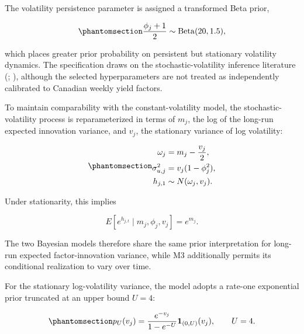 \documentclass[
  12pt,
  letterpaper,
  DIV=11,
  numbers=noendperiod]{scrreprt}
\begin{document}
The volatility persistence parameter is assigned a transformed Beta
prior,

\begin{equation}\protect\phantomsection\label{eq-volatility-persistence-prior}{
\frac{\phi_j+1}{2}
\sim\operatorname{Beta}(20,1.5),
}\end{equation}

which places greater prior probability on persistent but stationary
volatility dynamics. The specification draws on the
stochastic-volatility inference literature
(;
), although the
selected hyperparameters are not treated as independently calibrated to
Canadian weekly yield factors.

To maintain comparability with the constant-volatility model, the
stochastic-volatility process is reparameterized in terms of \(m_j\),
the log of the long-run expected innovation variance, and \(v_j\), the
stationary variance of log volatility:

\begin{equation}\protect\phantomsection\label{eq-finite-reparam}{
\begin{aligned}
\omega_j&=m_j-\frac{v_j}{2},\\
\sigma_{u,j}^2&=v_j(1-\phi_j^2),\\
h_{j,1}&\sim N(\omega_j,v_j).
\end{aligned}
}\end{equation}

Under stationarity, this implies

\[
E[e^{h_{j,t}}\mid m_j,\phi_j,v_j]=e^{m_j}.
\]

The two Bayesian models therefore share the same prior interpretation
for long-run expected factor-innovation variance, while M3 additionally
permits its conditional realization to vary over time.

For the stationary log-volatility variance, the model adopts a rate-one
exponential prior truncated at an upper bound \(U=4\):

\begin{equation}\protect\phantomsection\label{eq-finite-prior}{
p_U(v_j)
=\frac{e^{-v_j}}{1-e^{-U}}
\mathbf{1}_{(0,U)}(v_j),
\qquad U=4.
}\end{equation}
\end{document}
